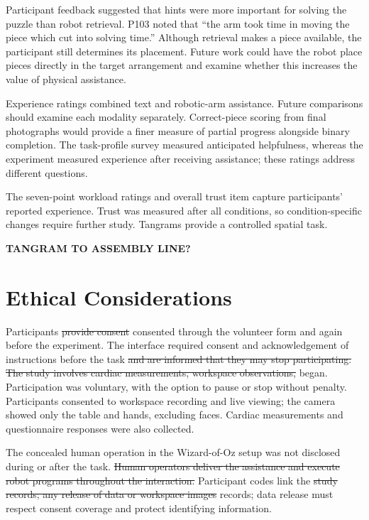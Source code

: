 \documentclass[sigconf,anonymous,balance=false]{aamas} %
\DeclareRobustCommand{\DIFadd}[1]{{\color{reviewadd}#1}} %
\DeclareRobustCommand{\DIFdel}[1]{{\color{reviewdel}\sout{#1}}} %
\providecommand{\DIFaddbegin}{} %
\providecommand{\DIFaddend}{} %
\providecommand{\DIFdelbegin}{} %
\providecommand{\DIFdelend}{} %
\providecommand{\DIFscaledelfig}{0.5}
\newlength{\DIFdelgraphicswidth} %
\newlength{\DIFdelgraphicsheight} %
\providecommand{\DIFaddincludegraphics}[2][]{{\color{blue}\fbox{\DIFOincludegraphics[#1]{#2}}}} %
\providecommand{\DIFdelincludegraphics}[2][]{%
\sbox{\DIFdelgraphicsbox}{\DIFOincludegraphics[#1]{#2}}%
\settoboxwidth{\DIFdelgraphicswidth}{\DIFdelgraphicsbox} %
\settoboxtotalheight{\DIFdelgraphicsheight}{\DIFdelgraphicsbox} %
\scalebox{\DIFscaledelfig}{%
\parbox[b]{\DIFdelgraphicswidth}{\usebox{\DIFdelgraphicsbox}\\[-\baselineskip] \rule{\DIFdelgraphicswidth}{0em}}\llap{\resizebox{\DIFdelgraphicswidth}{\DIFdelgraphicsheight}{%
\setlength{\unitlength}{\DIFdelgraphicswidth}%
\begin{picture}(1,1)%
\thicklines\linethickness{2pt} %
{\color[rgb]{1,0,0}\put(0,0){\framebox(1,1){}}}%
{\color[rgb]{1,0,0}\put(0,0){\line( 1,1){1}}}%
{\color[rgb]{1,0,0}\put(0,1){\line(1,-1){1}}}%
\end{picture}%
}\hspace*{3pt}}} %
} %
\DeclareRobustCommand{\DIFaddbegin}{\DIFOaddbegin \let\includegraphics\DIFaddincludegraphics} %
\DeclareRobustCommand{\DIFaddend}{\DIFOaddend \let\includegraphics\DIFOincludegraphics} %
\DeclareRobustCommand{\DIFdelbegin}{\DIFOdelbegin \let\includegraphics\DIFdelincludegraphics} %
\DeclareRobustCommand{\DIFdelend}{\DIFOaddend \let\includegraphics\DIFOincludegraphics} %
\begin{document}
Participant feedback suggested that hints were more important for solving the puzzle than robot retrieval. P103 noted that ``the arm took time in moving the piece which cut into solving time.'' Although retrieval makes a piece available, the participant still determines its placement. Future work could have the robot place pieces directly in the target arrangement and examine whether this increases the value of physical assistance.

Experience ratings combined text and robotic-arm assistance. Future comparisons should examine each modality separately. Correct-piece scoring from final photographs would provide a finer measure of partial progress alongside binary completion. The task-profile survey measured anticipated helpfulness, whereas the experiment measured experience after receiving assistance; these ratings address different questions.

The seven-point workload ratings and overall trust item capture participants' reported experience. Trust was measured after all conditions, so condition-specific changes require further study. Tangrams provide a controlled spatial task.

\textbf{TANGRAM TO ASSEMBLY LINE?}

\section{Ethical Considerations}

Participants \DIFdelbegin \DIFdel{provide consent }\DIFdelend \DIFaddbegin \DIFadd{consented through the volunteer form and again before the experiment. The interface required consent and acknowledgement of instructions }\DIFaddend before the task \DIFdelbegin \DIFdel{and are informed that they may stop participating. The study involves cardiac measurements, workspace observations, }\DIFdelend \DIFaddbegin \DIFadd{began. Participation was voluntary, with the option to pause or stop without penalty. Participants consented to workspace recording and live viewing; the camera showed only the table and hands, excluding faces. Cardiac measurements }\DIFaddend and questionnaire responses \DIFaddbegin \DIFadd{were also collected.
}

\DIFadd{The concealed human operation in the Wizard-of-Oz setup was not disclosed during or after the task}\DIFaddend . \DIFdelbegin \DIFdel{Human operators deliver the assistance and execute robot programs throughout the interaction. }\DIFdelend Participant codes link the \DIFdelbegin \DIFdel{study records; any release of data or workspace images }\DIFdelend \DIFaddbegin \DIFadd{records; data release }\DIFaddend must respect consent coverage and protect identifying information.
\DIFaddbegin 
\end{document}
